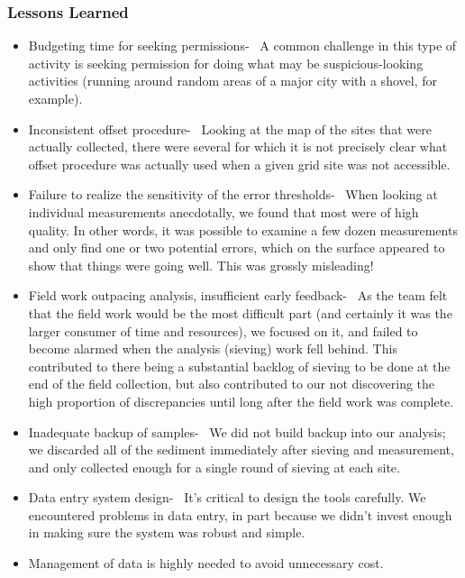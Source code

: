\documentclass[a4paper,12pt,twoside]{article}
\begin{document}
\subsubsection{Lessons Learned}
\begin{itemize}
    \item {\color {RHblue}Budgeting time for seeking permissions-}
\
A common challenge in this type of activity is seeking permission for doing what may be suspicious-looking activities (running around random areas of a major city with a shovel, for example).
    \item {\color {RHblue}Inconsistent offset procedure-}
\
Looking at the map of the sites that were actually collected, there were several for which it is not precisely clear what offset procedure was actually used when a given grid site was not accessible.

    \item {\color {RHblue}Failure to realize the sensitivity of the error thresholds-}
\
When looking at individual measurements anecdotally, we found that most were of high quality. In other words, it was possible to examine a few dozen measurements and only find one or two potential errors, which on the surface appeared to show that things were going well. This was grossly misleading! %

    \item {\color{RHblue} Field work outpacing analysis, insufficient early feedback-}
\
As the team felt that the field work would be the most difficult part (and certainly it was the larger consumer of time and resources), we focused on it, and failed to become alarmed when the analysis (sieving) work fell behind. This contributed to there being a substantial backlog of sieving to be done at the end of the field collection, but also contributed to our not discovering the high proportion of discrepancies until long after the field work was complete.

    \item {\color{RHblue}Inadequate backup of samples-}
\
We did not build backup into our analysis; we discarded all of the sediment immediately after sieving and measurement, and only collected enough for a single round of sieving at each site.

    \item {\color{RHblue}Data entry system design-}
\
It’s critical to design the tools carefully. We encountered problems in data entry, in part because we didn’t invest enough in making sure the system was robust and simple.

    \item Management of data is highly needed to avoid unnecessary cost.
\end{itemize}
\end{document}
